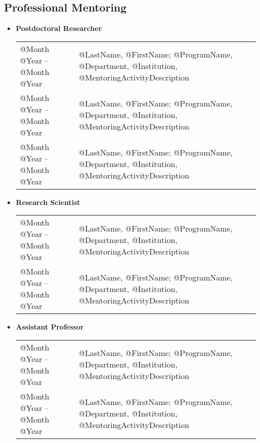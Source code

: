 \documentclass[10pt]{article}
\begin{document}
\begin{IOWA ONLY}
\subsection*{Professional Mentoring}
\smallskip

\begin{itemize}
\item[] \textbf{Postdoctoral Researcher}
\\[1.3ex]
\begin{tabular}{l@{\quad\ }p{30em}} 
 @Month @Year -- @Month @Year
 & @LastName, @FirstName; @ProgramName, @Department, @Institution, 
   @MentoringActivityDescription
 \\[3.5ex]
 @Month @Year -- @Month @Year
 & @LastName, @FirstName; @ProgramName, @Department, @Institution, 
   @MentoringActivityDescription
 \\[3.5ex]
 @Month @Year -- @Month @Year
 & @LastName, @FirstName; @ProgramName, @Department, @Institution, 
   @MentoringActivityDescription
 \\[3.5ex]
\end{tabular}

\item[] \textbf{Research Scientist}
\\[1.3ex]
\begin{tabular}{l@{\quad\ }p{30em}} 
 @Month @Year -- @Month @Year
 & @LastName, @FirstName; @ProgramName, @Department, @Institution,
   @MentoringActivityDescription
 \\[3.5ex]
 @Month @Year -- @Month @Year
 & @LastName, @FirstName; @ProgramName, @Department, @Institution,
   @MentoringActivityDescription
 \\[3.5ex]
\end{tabular}

\item[] \textbf{Assistant Professor}
\\[1.3ex]
\begin{tabular}{l@{\quad\ }p{30em}} 
 @Month @Year -- @Month @Year
 & @LastName, @FirstName; @ProgramName, @Department, @Institution,
   @MentoringActivityDescription
 \\[3.5ex]
 @Month @Year -- @Month @Year
 & @LastName, @FirstName; @ProgramName, @Department, @Institution,
   @MentoringActivityDescription
 \\[3.5ex]
\end{tabular}


\end{itemize}
\end{IOWA ONLY}
\end{document}

